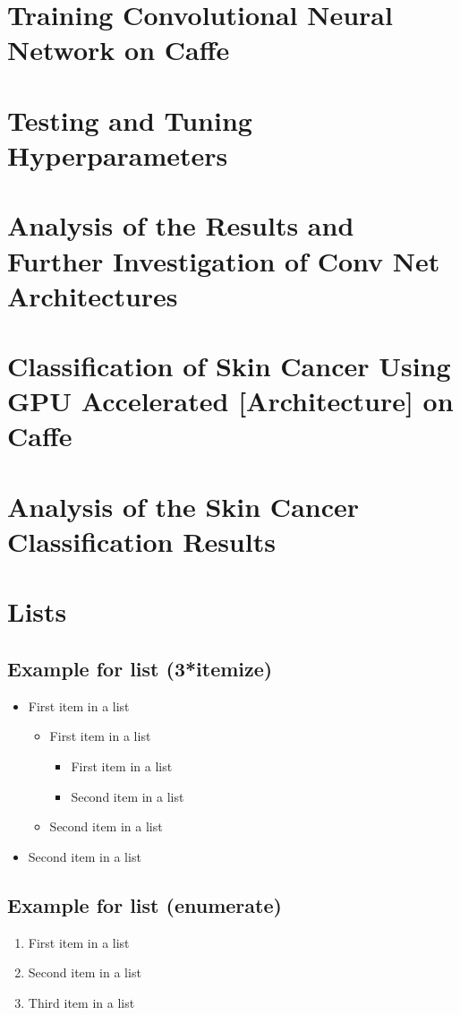 \documentclass[paper=a4, fontsize=11pt]{scrartcl}
\numberwithin{equation}{section}		%
\numberwithin{figure}{section}			%
\numberwithin{table}{section}			%
\begin{document}
	\section{Training Convolutional Neural Network on Caffe}
	\section{Testing and Tuning Hyperparameters}
	\section{Analysis of the Results and Further Investigation of Conv Net Architectures}
	\section{Classification of Skin Cancer Using GPU Accelerated [Architecture] on Caffe}
	\section{Analysis of the Skin Cancer Classification Results}
	
	
	\section{Lists}
	
	\subsection{Example for list (3*itemize)}
	\begin{itemize}
		\item First item in a list 
		\begin{itemize}
			\item First item in a list 
			\begin{itemize}
				\item First item in a list 
				\item Second item in a list 
			\end{itemize}
			\item Second item in a list 
		\end{itemize}
		\item Second item in a list 
	\end{itemize}
	
	\subsection{Example for list (enumerate)}
	\begin{enumerate}
		\item First item in a list 
		\item Second item in a list 
		\item Third item in a list
	\end{enumerate}
	
\end{document}
